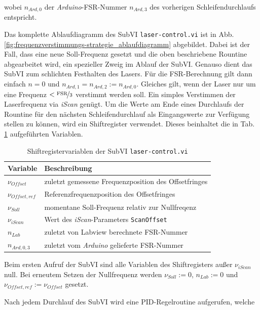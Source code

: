 wobei $n_{Ard,0}$ der \textit{Arduino}-FSR-Nummer $n_{Ard,3}$ des vorherigen
Schleifendurchlaufs entspricht.\par
Das komplette Ablaufdiagramm des SubVI \lstinline|laser-control.vi| ist in Abb.
\ref{fig:frequenzverstimmungs-strategie_ablaufdiagramm} abgebildet. Dabei ist
der Fall, dass eine neue Soll-Frequenz gesetzt und die oben beschriebene
Rountine abgearbeitet wird, ein spezieller Zweig im Ablauf der SubVI. Genauso
dient das SubVI zum schlichten Festhalten des Lasers. Für die FSR-Berechnung
gilt dann einfach $n=0$ und $n_{Ard,1}=n_{Ard,2}:=n_{Ard,0}$. Gleiches gilt,
wenn der Laser nur um eine Frequenz $<\nicefrac{\text{FSR}}{3}$ verstimmt werden
soll. Ein simples Verstimmen der Laserfrequenz via \textit{iScan} genügt. Um die
Werte am Ende eines Durchlaufs der Rountine für den nächsten Schleifendurchlauf
als Eingangswerte zur Verfügung stellen zu können, wird ein Shiftregister
verwendet.
Dieses beinhaltet die in Tab.
\ref{tab:shiftregister_laserkontrolle} aufgeführten Variablen.
\begin{table}
	\begin{tabular}{p{}p{}}
		\toprule
			Variable & Beschreibung \\
		\midrule[1px]
		\hline
			$\nu_{Offset}$ & zuletzt gemessene Frequenzposition des Offsetfringes\\
			$\nu_{Offset,ref}$ & Referenzfrequenzposition des Offsetfringes\\
			$\nu_{Soll}$ & momentane Soll-Frequenz relativ zur Nullfreqenz\\
			$\nu_{iScan}$ & Wert des \textit{iScan}-Parameters \lstinline|ScanOffset|\\
			$n_{Lab}$ & zuletzt von Labview berechnete FSR-Nummer\\
			$n_{Ard,0,3}$ & zuletzt vom \textit{Arduino} gelieferte FSR-Nummer\\
		\bottomrule[1px]
	\end{tabular}
	\caption[Shiftregister - \lstinline|laser-control.vi|]{Shiftregistervariablen
	der SubVI \lstinline|laser-control.vi|}
	\label{tab:shiftregister_laserkontrolle}
\end{table}
Beim ersten Aufruf der SubVI sind alle Variablen des Shiftregisters außer
$\nu_{iScan}$ null. Bei erneutem Setzen der Nullfrequenz werden $\nu_{Soll}:=0$,
$n_{Lab}:=0$ und $\nu_{Offset,ref}:=\nu_{Offset}$ gesetzt.\par
Nach jedem Durchlauf des SubVI wird eine PID-Regelroutine aufgerufen, welche
